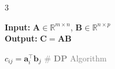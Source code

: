 \documentclass{note}
\newcommand{\codealg}[1]{\textcolor{gray}{\quad \# \textbf{#1} Algorithm}}
\begin{document}
\begin{multicols}{3}
\begin{algorithm}[H]
\tiny
\caption*{\textbf{MM} Matrix-matrix multiplication \vspace{-0.1cm} \\ \ps{$C = \sum_{i=1}^{m} \sum_{j=1}^{p} 2n = 2mnp=\Ocal(mnp)$}}
\textbf{Input:} $\mathbf{A} \in \mathbb{R}^{m \times n}$, $\mathbf{B} \in \mathbb{R}^{n \times p}$ \\
\textbf{Output:} $\mathbf{C} = \mathbf{A} \mathbf{B}$
\begin{algorithmic}[1]
      \State $c_{ij} = \mathbf{a}_i^\top \mathbf{b}_j$ \codealg{DP}
    \EndFor
  \EndFor
\end{algorithmic}
\end{algorithm}

\end{multicols}

\vspace{-27pt}
\end{document}
